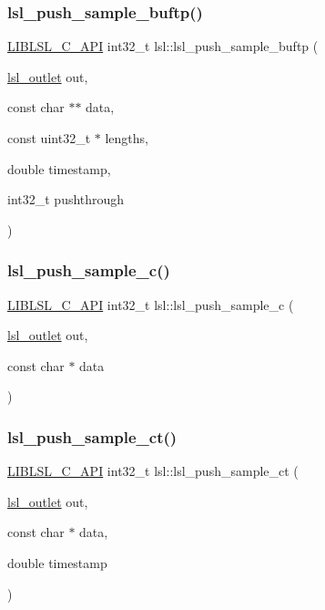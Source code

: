 \subsubsection{\texorpdfstring{lsl\+\_\+push\+\_\+sample\+\_\+buftp()}{lsl\_push\_sample\_buftp()}}
{\footnotesize\ttfamily \hyperlink{lsl__cpp_8h_aafd0ef1813e8be84a1420c4f1df64615}{L\+I\+B\+L\+S\+L\+\_\+\+C\+\_\+\+A\+PI} int32\+\_\+t lsl\+::lsl\+\_\+push\+\_\+sample\+\_\+buftp (\begin{DoxyParamCaption}\item[{\hyperlink{namespacelsl_abcf512b0f66dacf86c10b165995fd50b}{lsl\+\_\+outlet}}]{out,  }\item[{const char $\ast$$\ast$}]{data,  }\item[{const uint32\+\_\+t $\ast$}]{lengths,  }\item[{double}]{timestamp,  }\item[{int32\+\_\+t}]{pushthrough }\end{DoxyParamCaption})}

\mbox{\label{namespacelsl_aff896f8925d3453857deabc1f9cfd24a}} 
\subsubsection{\texorpdfstring{lsl\+\_\+push\+\_\+sample\+\_\+c()}{lsl\_push\_sample\_c()}}
{\footnotesize\ttfamily \hyperlink{lsl__cpp_8h_aafd0ef1813e8be84a1420c4f1df64615}{L\+I\+B\+L\+S\+L\+\_\+\+C\+\_\+\+A\+PI} int32\+\_\+t lsl\+::lsl\+\_\+push\+\_\+sample\+\_\+c (\begin{DoxyParamCaption}\item[{\hyperlink{namespacelsl_abcf512b0f66dacf86c10b165995fd50b}{lsl\+\_\+outlet}}]{out,  }\item[{const char $\ast$}]{data }\end{DoxyParamCaption})}

\mbox{\label{namespacelsl_a321429ed29e2b8b944f7724361628ba9}} 
\subsubsection{\texorpdfstring{lsl\+\_\+push\+\_\+sample\+\_\+ct()}{lsl\_push\_sample\_ct()}}
{\footnotesize\ttfamily \hyperlink{lsl__cpp_8h_aafd0ef1813e8be84a1420c4f1df64615}{L\+I\+B\+L\+S\+L\+\_\+\+C\+\_\+\+A\+PI} int32\+\_\+t lsl\+::lsl\+\_\+push\+\_\+sample\+\_\+ct (\begin{DoxyParamCaption}\item[{\hyperlink{namespacelsl_abcf512b0f66dacf86c10b165995fd50b}{lsl\+\_\+outlet}}]{out,  }\item[{const char $\ast$}]{data,  }\item[{double}]{timestamp }\end{DoxyParamCaption})}

